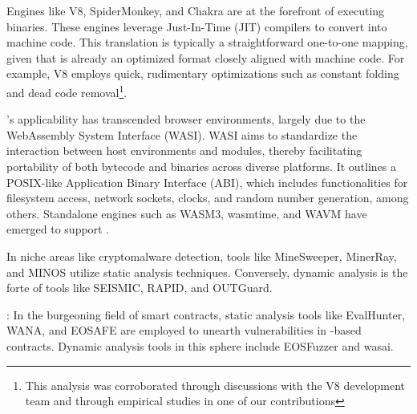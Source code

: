  Engines like V8\cite{v8}, SpiderMonkey\cite{spidermonkey}, and Chakra\cite{chakra} are at the forefront of executing \Wasm binaries. 
These engines leverage Just-In-Time (JIT) compilers to convert \Wasm into machine code. 
This translation is typically a straightforward one-to-one mapping, given that \Wasm is already an optimized format closely aligned with machine code. 
For example, V8 employs quick, rudimentary optimizations such as constant folding and dead code removal\footnote{This analysis was corroborated through discussions with the V8 development team and through empirical studies in one of our contributions\cite{CROW}}. 

 \Wasm's applicability has transcended browser environments, largely due to the WebAssembly System Interface (WASI)\cite{WASI}. 
WASI aims to standardize the interaction between host environments and \Wasm modules, thereby facilitating portability of both bytecode and binaries across diverse platforms. 
It outlines a POSIX-like Application Binary Interface (ABI), which includes functionalities for filesystem access, network sockets, clocks, and random number generation, among others. 
Standalone engines such as WASM3\cite{wasm3}, wasmtime\cite{wasmtime}, and WAVM\cite{WAVM} have emerged to support \Wasm.

 In niche areas like cryptomalware detection, tools like MineSweeper\cite{minsweeper}, MinerRay\cite{MinerRay}, and MINOS\cite{MINOS} utilize static analysis techniques. 
Conversely, dynamic analysis is the forte of tools like SEISMIC\cite{SEISMIC}, RAPID\cite{RAPID}, and OUTGuard\cite{outguard}.

: In the burgeoning field of smart contracts, static analysis tools like EvalHunter\cite{evalhunter}, WANA\cite{wana}, and EOSAFE\cite{eosafe} are employed to unearth vulnerabilities in \Wasm-based contracts. Dynamic analysis tools in this sphere include EOSFuzzer\cite{eosfuzzer} and wasai\cite{wasai}.

